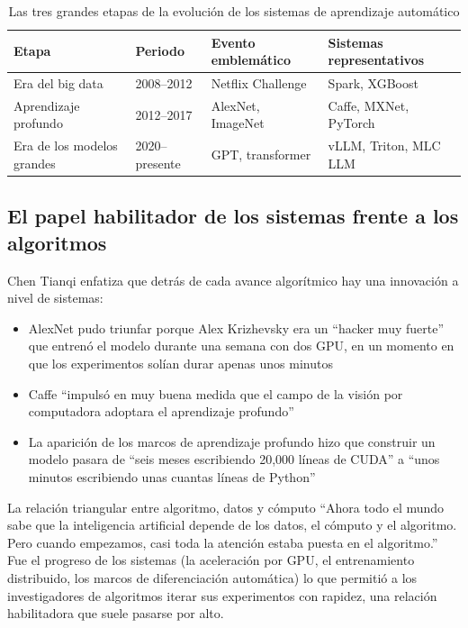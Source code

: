\begin{table}[H]
\centering
\begin{tabular}{p{2.5cm}p{3cm}p{3cm}p{4cm}}
\toprule
\textbf{Etapa} & \textbf{Periodo} & \textbf{Evento emblemático} & \textbf{Sistemas representativos} \\
\midrule
Era del big data & 2008--2012 & Netflix Challenge & Spark, XGBoost \\
Aprendizaje profundo & 2012--2017 & AlexNet, ImageNet & Caffe, MXNet, PyTorch \\
Era de los modelos grandes & 2020--presente & GPT, transformer & vLLM, Triton, MLC LLM \\
\bottomrule
\end{tabular}
\caption{Las tres grandes etapas de la evolución de los sistemas de aprendizaje automático}
\end{table}

\subsection{El papel habilitador de los sistemas frente a los algoritmos}

Chen Tianqi enfatiza que detrás de cada avance algorítmico hay una innovación a nivel de sistemas:

\begin{itemize}
    \item AlexNet pudo triunfar porque Alex Krizhevsky era un ``hacker muy fuerte'' que entrenó el modelo durante una semana con dos GPU, en un momento en que los experimentos solían durar apenas unos minutos
    \item Caffe ``impulsó en muy buena medida que el campo de la visión por computadora adoptara el aprendizaje profundo''
    \item La aparición de los marcos de aprendizaje profundo hizo que construir un modelo pasara de ``seis meses escribiendo 20,000 líneas de CUDA'' a ``unos minutos escribiendo unas cuantas líneas de Python''
\end{itemize}

\begin{importantbox}{La relación triangular entre algoritmo, datos y cómputo}
``Ahora todo el mundo sabe que la inteligencia artificial depende de los datos, el cómputo y el algoritmo. Pero cuando empezamos, casi toda la atención estaba puesta en el algoritmo.'' Fue el progreso de los sistemas (la aceleración por GPU, el entrenamiento distribuido, los marcos de diferenciación automática) lo que permitió a los investigadores de algoritmos iterar sus experimentos con rapidez, una relación habilitadora que suele pasarse por alto.
\end{importantbox}

